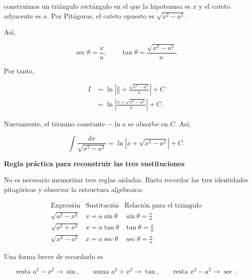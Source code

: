 \documentclass[12pt]{article}
\theoremstyle{definition}
\theoremstyle{remark}
\begin{document}
construimos un triángulo rectángulo en el que la hipotenusa es $x$ y el
cateto adyacente es $a$. Por Pitágoras, el cateto opuesto es
$\sqrt{x^2-a^2}$.

\begin{center}
\end{center}

Así,

\[
\sec\theta=\frac{x}{a},
\qquad
\tan\theta=\frac{\sqrt{x^2-a^2}}{a}.
\]

Por tanto,

\begin{align*}
I
&=\ln\left|
\frac{x}{a}+\frac{\sqrt{x^2-a^2}}{a}
\right|+C\\
&=\ln\left|
\frac{x+\sqrt{x^2-a^2}}{a}
\right|+C.
\end{align*}

Nuevamente, el término constante $-\ln a$ se absorbe en $C$. Así,

\[
\boxed{
\int\frac{dx}{\sqrt{x^2-a^2}}
=\ln|x+\sqrt{x^2-a^2}|+C.}
\]

\textbf{Regla práctica para reconstruir las tres sustituciones}

No es necesario memorizar tres reglas aisladas. Basta recordar las tres
identidades pitagóricas y observar la estructura algebraica:

\[
\boxed{
\begin{array}{c|c|c}
\text{Expresión} & \text{Sustitución} & \text{Relación para el triángulo}\\ \hline
\sqrt{a^2-x^2} & x=a\sin\theta & \displaystyle\sin\theta=\frac{x}{a}\\[3mm]
\sqrt{a^2+x^2} & x=a\tan\theta & \displaystyle\tan\theta=\frac{x}{a}\\[3mm]
\sqrt{x^2-a^2} & x=a\sec\theta & \displaystyle\sec\theta=\frac{x}{a}
\end{array}}
\]

Una forma breve de recordarlo es

\[
\boxed{
\text{resta }a^2-x^2\longrightarrow\sin,
\qquad
\text{suma }a^2+x^2\longrightarrow\tan,
\qquad
\text{resta }x^2-a^2\longrightarrow\sec.}
\]
\end{document}
